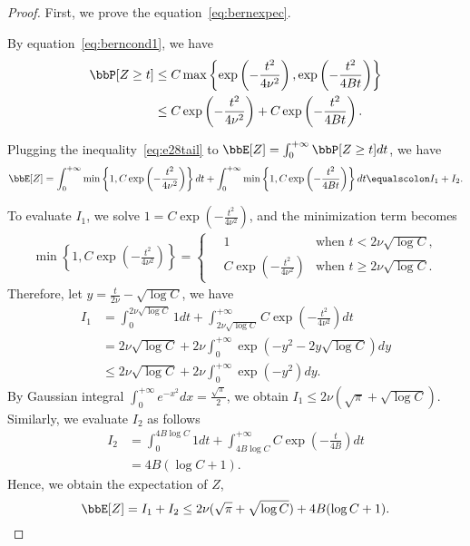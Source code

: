 \documentclass[11pt]{article}
\newcommand{\of}[1]{\left(#1\right)}
\newcommand{\offf}[1]{\left\{#1\right\}}
\theoremstyle{plain}
\theoremstyle{definition}
\begin{document}
\begin{proof}
	First, we prove the equation~\eqref{eq:bernexpec}. 
	
	\vspace{0.2cm}
	By equation~\eqref{eq:berncond1}, we have
	\begin{align}
		\bbP[Z \geq t] &\leq C \max \offf{\exp \of{-\frac{t^2}{4 \nu^2}}, \exp \of{-\frac{t^2}{4 Bt}} }\\
		&\leq C \exp \of{-\frac{t^2}{4 \nu^2}} + C \exp \of{-\frac{t^2}{4 Bt}}.\label{eq:e28tail}
	\end{align}
	
	Plugging the inequality~\eqref{eq:e28tail} to $\bbE[Z] = \int_{0}^{+\infty} \bbP[Z \geq t] dt$, we have
	\begin{equation}
		\bbE[Z] = \int_{0}^{+ \infty} \min \offf{1, C \exp \of{-\frac{t^2}{4 \nu^2}}} dt + \int_{0}^{+ \infty} \min\offf{1, C \exp \of{-\frac{t^2}{4 Bt}}} dt   \equalscolon I_1 + I_2.
	\end{equation}
	
	To evaluate $I_1$, we solve $1 = C \exp \of{-\frac{t^2}{4 \nu^2}} $, and the minimization term becomes
	\begin{align}
		\min \offf{1, C \exp \of{-\frac{t^2}{4 \nu^2}}} = \begin{cases}
			\quad 1 & \text{when } t < 2\nu \sqrt{\log C},\\
			\quad C \exp \of{-\frac{t^2}{4 \nu^2}} & \text{when } t \geq 2\nu \sqrt{\log C}.
		\end{cases}
	\end{align}
	Therefore, let $ y = \frac{t}{2\nu} - \sqrt{\log C}$, we have 
	\begin{align}
		I_1 &= \int_{0}^{ 2\nu \sqrt{\log C}} 1 dt + \int_{2\nu \sqrt{\log C}}^{+\infty} C \exp \of{-\frac{t^2}{4 \nu^2}} dt\\
		&=  2\nu \sqrt{\log C} + 2\nu\int_{0}^{+\infty} \exp \of{-y^2 - 2y \sqrt{\log C}} dy\\
		&\leq  2\nu \sqrt{\log C} + 2\nu\int_{0}^{+\infty} \exp \of{-y^2} dy.
	\end{align}
	By Gaussian integral $\int_{0}^{+\infty} e^{-x^2} dx = \frac{\sqrt{\pi}}{2}$, we obtain $I_1 \leq 2\nu (\sqrt{\pi} + \sqrt{\log C})$. Similarly, we evaluate $I_2$ as follows 
	\begin{align}
		I_2 &= \int_{0}^{4B \log C} 1 dt + \int_{4B \log C}^{+\infty} C \exp \of{-\frac{t}{4B}} dt\\
		 &= 4B (\log C + 1).
	\end{align}
	Hence, we obtain the expectation of $Z$,
	\begin{equation}
		\bbE[Z] = I_1 + I_2 \leq  2\nu (\sqrt{\pi} + \sqrt{\log C}) + 4B (\log C + 1).
	\end{equation}
	

\end{proof}
\end{document}
